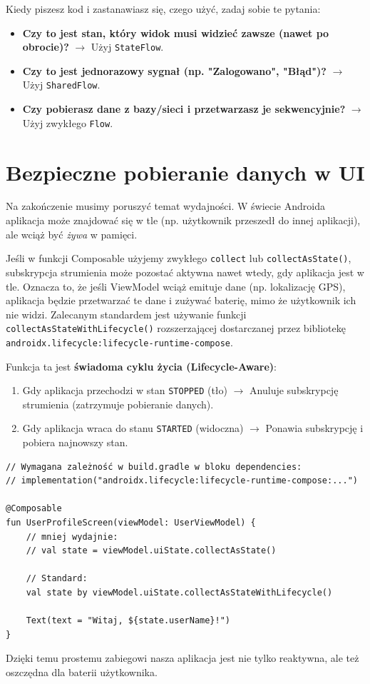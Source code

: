 Kiedy piszesz kod i zastanawiasz się, czego użyć, zadaj sobie te pytania:
\begin{itemize}
    \item \textbf{Czy to jest stan, który widok musi widzieć zawsze (nawet po obrocie)?} $\rightarrow$ Użyj \texttt{StateFlow}.
    \item \textbf{Czy to jest jednorazowy sygnał (np. "Zalogowano", "Błąd")?} $\rightarrow$ Użyj \texttt{SharedFlow}.
    \item \textbf{Czy pobierasz dane z bazy/sieci i przetwarzasz je sekwencyjnie?} $\rightarrow$ Użyj zwykłego \texttt{Flow}.
\end{itemize}

\section{Bezpieczne pobieranie danych w UI}

Na zakończenie musimy poruszyć temat wydajności. W świecie Androida aplikacja może znajdować się w tle (np. użytkownik przeszedł do innej aplikacji), ale wciąż być \textit{żywa} w pamięci.

Jeśli w funkcji Composable użyjemy zwykłego \texttt{collect} lub \texttt{collectAsState()}, subskrypcja strumienia może pozostać aktywna nawet wtedy, gdy aplikacja jest w tle.
Oznacza to, że jeśli ViewModel wciąż emituje dane (np. lokalizację GPS), aplikacja będzie przetwarzać te dane i zużywać baterię, mimo że użytkownik ich nie widzi. Zalecanym standardem jest używanie funkcji \texttt{collectAsStateWithLifecycle()} rozszerzającej dostarczanej przez bibliotekę \texttt{androidx.lifecycle:lifecycle-runtime-compose}.

Funkcja ta jest \textbf{świadoma cyklu życia (Lifecycle-Aware)}:
\begin{enumerate}
    \item Gdy aplikacja przechodzi w stan \texttt{STOPPED} (tło) $\rightarrow$ Anuluje subskrypcję strumienia (zatrzymuje pobieranie danych).
    \item Gdy aplikacja wraca do stanu \texttt{STARTED} (widoczna) $\rightarrow$ Ponawia subskrypcję i pobiera najnowszy stan.
\end{enumerate}

\begin{verbatim}
// Wymagana zależność w build.gradle w bloku dependencies:
// implementation("androidx.lifecycle:lifecycle-runtime-compose:...")

@Composable
fun UserProfileScreen(viewModel: UserViewModel) {
    // mniej wydajnie:
    // val state = viewModel.uiState.collectAsState()

    // Standard:
    val state by viewModel.uiState.collectAsStateWithLifecycle()

    Text(text = "Witaj, ${state.userName}!")
}
\end{verbatim}

Dzięki temu prostemu zabiegowi nasza aplikacja jest nie tylko reaktywna, ale też oszczędna dla baterii użytkownika.